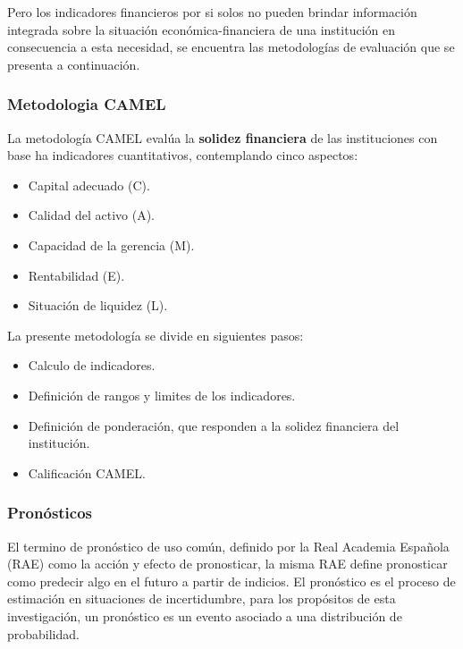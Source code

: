 \documentclass[
  12pt,
]{article}
\providecommand{\tightlist}{%
  \setlength{\itemsep}{0pt}\setlength{\parskip}{0pt}}
\begin{document}
Pero los indicadores financieros por si solos no pueden brindar
información integrada sobre la situación económica-financiera de una
institución en consecuencia a esta necesidad, se encuentra las
metodologías de evaluación que se presenta a continuación.

\hypertarget{metodologia-camel}{%
\subsubsection{Metodologia CAMEL}\label{metodologia-camel}}

La metodología CAMEL evalúa la \textbf{solidez financiera} de las
instituciones con base ha indicadores cuantitativos, contemplando cinco
aspectos:

\begin{itemize}
\tightlist
\item
  Capital adecuado (C).
\item
  Calidad del activo (A).
\item
  Capacidad de la gerencia (M).
\item
  Rentabilidad (E).
\item
  Situación de liquidez (L).
\end{itemize}

La presente metodología se divide en siguientes pasos:

\begin{itemize}
\tightlist
\item
  Calculo de indicadores.
\item
  Definición de rangos y limites de los indicadores.
\item
  Definición de ponderación, que responden a la solidez financiera del
  institución.
\item
  Calificación CAMEL.
\end{itemize}

\hypertarget{pronuxf3sticos}{%
\subsubsection{Pronósticos}\label{pronuxf3sticos}}

El termino de pronóstico de uso común, definido por la Real Academia
Española (RAE) como la acción y efecto de pronosticar, la misma RAE
define pronosticar como predecir algo en el futuro a partir de indicios.
El pronóstico es el proceso de estimación en situaciones de
incertidumbre, para los propósitos de esta investigación, un pronóstico
es un evento asociado a una distribución de probabilidad.
\end{document}
